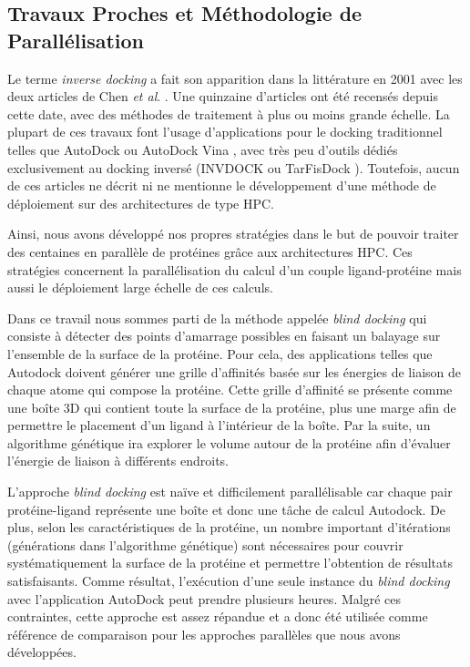 \subsection{Travaux Proches et Méthodologie de Parallélisation}

Le terme \textit{inverse docking} a fait son apparition dans la littérature en 2001 avec les deux articles de Chen \textit{et al}. \cite{Chen2001,Chen2001b}. Une quinzaine d'articles ont été recensés depuis cette date, avec des méthodes de traitement à plus ou moins grande échelle. La plupart de ces travaux font l'usage d'applications pour le docking traditionnel telles que AutoDock \cite{Steffen07} ou AutoDock Vina \cite{Lauro2011,Lauro2012}, avec très peu d'outils dédiés exclusivement au docking inversé (INVDOCK \cite{Chen2001,Chen2001b} ou TarFisDock \cite{Li2006}). Toutefois, aucun de ces articles ne décrit ni ne mentionne le développement d'une méthode de déploiement sur des architectures de type HPC.

Ainsi, nous avons développé nos propres stratégies dans le but de pouvoir traiter des centaines en parallèle de protéines grâce aux architectures HPC.
Ces stratégies concernent la parallélisation du calcul d'un couple ligand-protéine mais aussi le déploiement large échelle de ces calculs. 

Dans ce travail nous sommes parti de la méthode appelée \textit{blind docking} qui consiste à détecter des points d'amarrage possibles en faisant un balayage sur l'ensemble de la surface de la protéine. Pour cela, des applications telles que Autodock doivent générer une grille d'affinités basée sur les énergies de liaison de chaque atome qui compose la protéine. Cette grille d'affinité se présente comme une boîte 3D qui contient toute la surface de la protéine, plus une marge afin de permettre le placement d'un ligand à l'intérieur de la boîte. Par la suite, un algorithme génétique ira explorer le volume autour de la protéine afin d'évaluer l'énergie de liaison à différents endroits. 

L'approche \textit{blind docking} est naïve et difficilement parallélisable car chaque pair protéine-ligand représente une boîte et donc une tâche de calcul Autodock. De plus, selon les caractéristiques de la protéine, un nombre important d'itérations (générations dans l'algorithme génétique) sont nécessaires pour couvrir systématiquement la surface de la protéine et permettre l'obtention de résultats satisfaisants. Comme résultat, l'exécution d'une seule instance du \textit{blind docking} avec l'application AutoDock peut prendre plusieurs heures. Malgré ces contraintes, cette approche est assez répandue et a donc été utilisée comme référence de comparaison pour les approches parallèles que nous avons développées.

